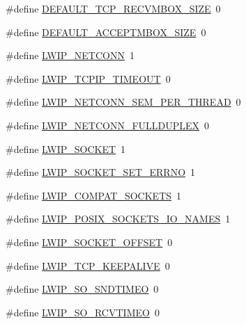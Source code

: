 \begin{DoxyCompactItemize}
\item 
\#define \hyperlink{group__lwip__opts__thread_ga1bd172938b9c8ba63156fcafc87e83c7}{D\+E\+F\+A\+U\+L\+T\+\_\+\+T\+C\+P\+\_\+\+R\+E\+C\+V\+M\+B\+O\+X\+\_\+\+S\+I\+ZE}~0
\item 
\#define \hyperlink{group__lwip__opts__thread_ga5d5a6e04abe2ec233c7acdb09f992461}{D\+E\+F\+A\+U\+L\+T\+\_\+\+A\+C\+C\+E\+P\+T\+M\+B\+O\+X\+\_\+\+S\+I\+ZE}~0
\item 
\#define \hyperlink{group__lwip__opts__netconn_ga478041b8544461258f6961bf0f3c1a77}{L\+W\+I\+P\+\_\+\+N\+E\+T\+C\+O\+NN}~1
\item 
\#define \hyperlink{group__lwip__opts__netconn_ga1cd8d15a42262a0defaedabed126ea99}{L\+W\+I\+P\+\_\+\+T\+C\+P\+I\+P\+\_\+\+T\+I\+M\+E\+O\+UT}~0
\item 
\#define \hyperlink{group__lwip__opts__netconn_ga2543345adf7d2c307df78a54ac2ba8c4}{L\+W\+I\+P\+\_\+\+N\+E\+T\+C\+O\+N\+N\+\_\+\+S\+E\+M\+\_\+\+P\+E\+R\+\_\+\+T\+H\+R\+E\+AD}~0
\item 
\#define \hyperlink{group__lwip__opts__netconn_ga7bfe8487a3abffdd9d6730977d22c406}{L\+W\+I\+P\+\_\+\+N\+E\+T\+C\+O\+N\+N\+\_\+\+F\+U\+L\+L\+D\+U\+P\+L\+EX}~0
\item 
\#define \hyperlink{group__lwip__opts__socket_ga1cb62ce61ac39d7d6728ae5d3d3b927f}{L\+W\+I\+P\+\_\+\+S\+O\+C\+K\+ET}~1
\item 
\#define \hyperlink{group__lwip__opts__socket_ga7222c197f4ad4eb4f6c96bec865297a8}{L\+W\+I\+P\+\_\+\+S\+O\+C\+K\+E\+T\+\_\+\+S\+E\+T\+\_\+\+E\+R\+R\+NO}~1
\item 
\#define \hyperlink{group__lwip__opts__socket_gafed2811f031822ec5afa1ee211fb7447}{L\+W\+I\+P\+\_\+\+C\+O\+M\+P\+A\+T\+\_\+\+S\+O\+C\+K\+E\+TS}~1
\item 
\#define \hyperlink{group__lwip__opts__socket_ga484c38ab08f60d5b3335d23d31f9a402}{L\+W\+I\+P\+\_\+\+P\+O\+S\+I\+X\+\_\+\+S\+O\+C\+K\+E\+T\+S\+\_\+\+I\+O\+\_\+\+N\+A\+M\+ES}~1
\item 
\#define \hyperlink{group__lwip__opts__socket_gad0197c845fbb44c920b272f0fef3b57e}{L\+W\+I\+P\+\_\+\+S\+O\+C\+K\+E\+T\+\_\+\+O\+F\+F\+S\+ET}~0
\item 
\#define \hyperlink{group__lwip__opts__socket_ga8b9369ab260f032686a81c77c5b4db77}{L\+W\+I\+P\+\_\+\+T\+C\+P\+\_\+\+K\+E\+E\+P\+A\+L\+I\+VE}~0
\item 
\#define \hyperlink{group__lwip__opts__socket_ga1162cb685f202d9b21c11344b8209a58}{L\+W\+I\+P\+\_\+\+S\+O\+\_\+\+S\+N\+D\+T\+I\+M\+EO}~0
\item 
\#define \hyperlink{group__lwip__opts__socket_ga91af3ade95b20b9a60c65ed0380fa0ed}{L\+W\+I\+P\+\_\+\+S\+O\+\_\+\+R\+C\+V\+T\+I\+M\+EO}~0

\end{DoxyCompactItemize}
